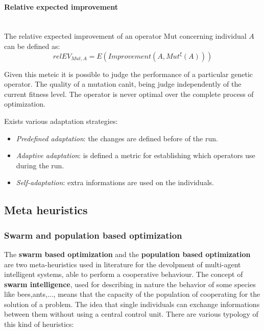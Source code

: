 \documentclass{article}
\begin{document}
\paragraph{Relative expected improvement}\mbox{}\\
The relative expected improvement of an operator Mut concerning individual $A$ can be
defined as:
$$relEV_{Mut,A}=E(Improvement(A,Mut^\xi(A)))$$

Given this meteic it is possible to judge the performance of a particular genetic operator.
The quality of a mutation canìt, being judge independently of the current fitness level.
The operator is never optimal over the complete process of optimization.

Exists various adaptation strategies:
\begin{itemize}
    \item \textit{Predefined adaptation}: the changes are defined before of the run.
    \item \textit{Adaptive adaptation}: is defined a metric for establishing which operators
    use during the run.
    \item \textit{Self-adaptation}: extra informations are used on the individuals.
\end{itemize}

\subsection{Meta heuristics}
\subsubsection{Swarm and population based optimization}
The \textbf{swarm based optimization} and the \textbf{population based optimization}
are two meta-heuristics used in literature for the devolpment of multi-agent intelligent
systems, able to perform a cooperative behaviour. The concept of \textbf{swarm intelligence},
used for describing in nature the behavior of some species like bees,ants,..., means that
the capacity of the population of cooperating for the solution of a problem. The idea
that single individuals can exchange informations between them without using a central
control unit. There are various typology of this kind of heuristics:
\end{document}
